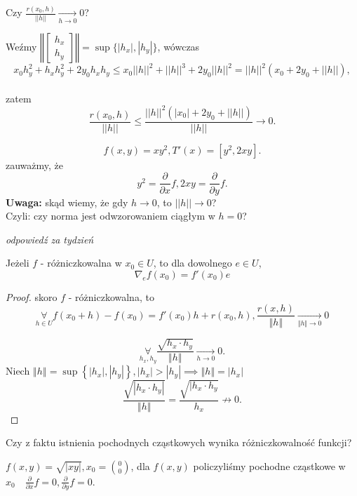 \documentclass[../main.tex]{subfiles}
\begin{document}
\begin{pytanie}
    Czy $\frac{r(x_0,h)}{||h||}\underset{h \to 0}{\longrightarrow} 0$?
\end{pytanie}
Weźmy $\left\Vert \begin{bmatrix} h_x\\h_y \end{bmatrix} \right\Vert = \sup\{|h_x|,|h_y|\}$, wówczas\\
\[
    x_0h_y^2 + h_xh_y^2 + 2y_0h_xh_y \leq x_0 ||h||^2 + ||h||^3 + 2y_0||h||^2 = ||h||^2(x_0 +2y_0 + ||h||),
\]\\
zatem
\[
    \frac{r(x_0,h)}{||h||} \leq \frac{||h||^2(|x_0|+2y_0+||h||)}{||h||} \to 0.
\]

\[
    f(x,y)=xy^2, T'(x)=[y^2,2xy].
\]
zauważmy, że
\[
    y^2= \frac{\partial}{\partial x} f, 2xy = \frac{\partial}{\partial y} f.
\]
\textbf{Uwaga: }skąd wiemy, że gdy $h\to 0$, to $||h||\to 0$?\\
Czyli: czy norma jest odwzorowaniem ciągłym w $h=0$?

\textit{odpowiedź za tydzień}

\begin{tw}
Jeżeli $f$ - różniczkowalna w $x_0 \in U$, to dla dowolnego $e\in U$, $$\nabla_e f(x_0) = f'(x_0)e$$
\end{tw}

\begin{proof}
    skoro $f$ - różniczkowalna, to
    \begin{equation}
        \label{eq: eq_2.1}
        \underset{h\in U}{\forall} f(x_0+h) - f(x_0) = f'(x_0)h + r(x_0,h), \frac{r(x,h)}{\Vert h \Vert } \underset{\Vert h \Vert \to 0}{\longrightarrow} 0
    \end{equation}

    \[
        \underset{h_x, h_y}{\forall} \frac{\sqrt{h_x\cdot h_y} }{\left\Vert h \right\Vert } \underset{h\to 0}{\longrightarrow} 0
    .\]
Niech $\left\Vert h \right\Vert = \sup \left\{ |h_x|, |h_y| \right\}, |h_x| > |h_y| \implies \left\Vert h \right\Vert = |h_x|$
\[
    \frac{\sqrt{|h_x \cdot h_y|} }{\left\Vert h \right\Vert } = \frac{\sqrt{|h_x \cdot h_y}}{h_x} \not \to  0
.\]


\end{proof}


\begin{pytanie}
Czy z faktu istnienia pochodnych cząstkowych wynika różniczkowalność funkcji?
\end{pytanie}

\begin{przyklad}
\end{przyklad}
$f(x,y) = \sqrt{|xy|}, x_0=\binom{0}{0}$, dla $f(x,y)$ policzyliśmy pochodne cząstkowe w $x_0 \quad \frac{\partial}{\partial x} f = 0, \frac{\partial}{\partial y} f = 0$.
\vspace{0.3cm}
\end{document}
